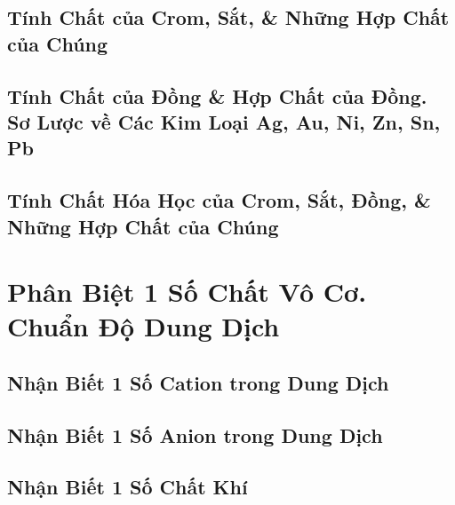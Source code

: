 \documentclass{article}
\numberwithin{equation}{section}
\begin{document}

\subsection{Tính Chất của Crom, Sắt, \& Những Hợp Chất của Chúng}


\subsection{Tính Chất của Đồng \& Hợp Chất của Đồng. Sơ Lược về Các Kim Loại Ag, Au, Ni, Zn, Sn, Pb}


\subsection{Tính Chất Hóa Học của Crom, Sắt, Đồng, \& Những Hợp Chất của Chúng}


\section{Phân Biệt 1 Số Chất Vô Cơ. Chuẩn Độ Dung Dịch}

\subsection{Nhận Biết 1 Số Cation trong Dung Dịch}


\subsection{Nhận Biết 1 Số Anion trong Dung Dịch}


\subsection{Nhận Biết 1 Số Chất Khí}

\end{document}
